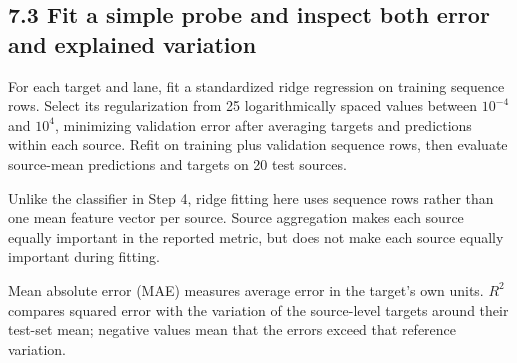 \documentclass[11pt,letterpaper]{article}
\begin{document}
\subsection{7.3 Fit a simple probe and inspect both error and explained
variation}\label{fit-a-simple-probe-and-inspect-both-error-and-explained-variation}

For each target and lane, fit a standardized ridge regression on
training sequence rows. Select its regularization from 25
logarithmically spaced values between \(10^{-4}\) and \(10^4\),
minimizing validation error after averaging targets and predictions
within each source. Refit on training plus validation sequence rows,
then evaluate source-mean predictions and targets on 20 test sources.

Unlike the classifier in Step 4, ridge fitting here uses sequence rows
rather than one mean feature vector per source. Source aggregation makes
each source equally important in the reported metric, but does not make
each source equally important during fitting.

Mean absolute error (MAE) measures average error in the target's own
units. \(R^2\) compares squared error with the variation of the
source-level targets around their test-set mean; negative values mean
that the errors exceed that reference variation.
\end{document}
